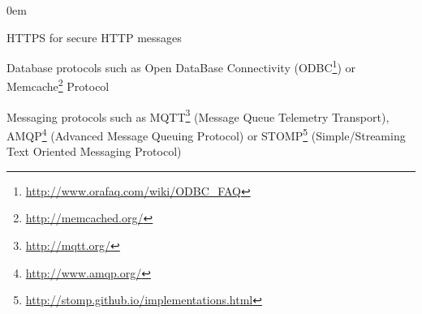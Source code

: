 \documentclass[a4paper,11pt,twoside]{report}
\begin{document}
\begin{list}{-}{}
\itemsep0em
       \item HTTPS for secure HTTP messages
       \item Database protocols such as Open DataBase Connectivity (ODBC\footnote{\url{http://www.orafaq.com/wiki/ODBC_FAQ}}) or Memcache\footnote{\url{http://memcached.org/}} Protocol
       \item Messaging protocols such as MQTT\footnote{\url{http://mqtt.org/}} (Message Queue Telemetry Transport), AMQP\footnote{\url{http://www.amqp.org/}} (Advanced Message Queuing Protocol) or STOMP\footnote{\url{http://stomp.github.io/implementations.html}} (Simple/Streaming Text Oriented Messaging Protocol) 
\end{list}

\clearpage
\end{document}
